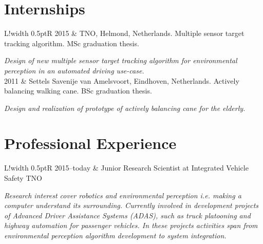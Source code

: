 \documentclass[a4paper,10pt]{article}
\newcommand\VRule{\color{lightgray}\vrule width 0.5pt}
\begin{document}
\section*{Internships}
\begin{tabular}{L!{\VRule}R}
2015 & TNO, Helmond, Netherlands. Multiple sensor target tracking algorithm. MSc graduation thesis. \par\textit{Design of new multiple sensor target tracking algorithm for environmental perception in an automated driving use-case.}\\
2011 & Settels Savenije van Amelsvoort, Eindhoven, Netherlands. Actively balancing walking cane. BSc graduation thesis. \par\textit{Design and realization of prototype of actively balancing cane for the elderly.}\\
\end{tabular}

\section*{Professional Experience}
\begin{tabular}{L!{\VRule}R}
2015--today & Junior Research Scientist at Integrated Vehicle Safety TNO \par\textit{Research interest cover robotics and environmental perception i.e. making a computer understand its surrounding. Currently involved in development projects of Advanced Driver Assistance Systems (ADAS), such as truck platooning and highway automation for passenger vehicles. In these projects activities span from environmental perception algorithm development to system integration.}\\
\end{tabular}
\end{document}

